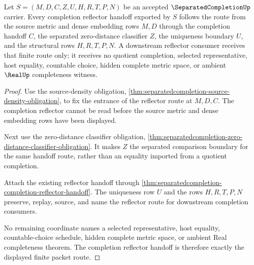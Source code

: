 \begin{theorem}
\label{thm:separatedcompletion-completion-reflector-route}
Let $S=(M,D,C,Z,U,H,R,T,P,N)$ be an accepted $\SeparatedCompletionUp$ carrier. Every completion reflector handoff exported by $S$ follows the route from the source metric and dense embedding rows $M,D$ through the completion handoff $C$, the separated zero-distance classifier $Z$, the uniqueness boundary $U$, and the structural rows $H,R,T,P,N$. A downstream reflector consumer receives that finite route only; it receives no quotient completion, selected representative, host equality, countable choice, hidden complete metric space, or ambient $\RealUp$ completeness witness.
\end{theorem}
\begin{proof}
Use the source-density obligation, \autoref{thm:separatedcompletion-source-density-obligation}, to fix the entrance of the reflector route at $M,D,C$. The completion reflector cannot be read before the source metric and dense embedding rows have been displayed.

Next use the zero-distance classifier obligation, \autoref{thm:separatedcompletion-zero-distance-classifier-obligation}. It makes $Z$ the separated comparison boundary for the same handoff route, rather than an equality imported from a quotient completion.

Attach the existing reflector handoff through \autoref{thm:separatedcompletion-completion-reflector-handoff}. The uniqueness row $U$ and the rows $H,R,T,P,N$ preserve, replay, source, and name the reflector route for downstream completion consumers.

No remaining coordinate names a selected representative, host equality, countable-choice schedule, hidden complete metric space, or ambient Real completeness theorem. The completion reflector handoff is therefore exactly the displayed finite packet route.
\end{proof}

